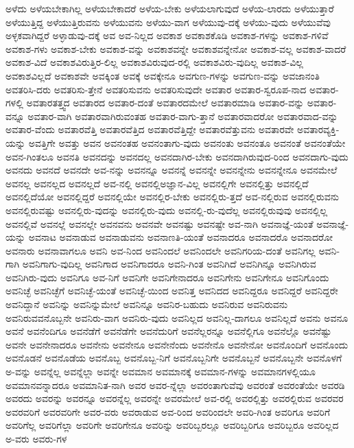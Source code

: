 {ಅಳೆದು
ಅಳೆಯಬೇಕಾಗಿಲ್ಲ
ಅಳೆಯಬೇಕಾದರೆ
ಅಳೆಯ-ಬೇಕು
ಅಳೆಯಲಾಗುವುದೆ
ಅಳೆಯ-ಲಾರದು
ಅಳೆಯುತ್ತಾರೆ
ಅಳೆಯುತ್ತಿದ್ದ
ಅಳೆಯುತ್ತಿರುವನು
ಅಳೆಯುವನು
ಅಳೆಯು-ವಾಗ
ಅಳೆಯುವು-ದಕ್ಕೆ
ಅಳೆಯು-ವುದು
ಅಳೆಯುವೆವು
ಅಳ್ಳಕವಾಗಿದ್ದರೆ
ಅಳ್ಳಾಡುವು-ದಕ್ಕೆ
ಅವ
ಅವ-ನಿಲ್ಲದ
ಅವಕಾಶ
ಅವಕಾಶಕೊಡಿ
ಅವಕಾಶ-ಗಳನ್ನು
ಅವಕಾಶ-ಗಳಿವೆ
ಅವಕಾಶ-ಗಳು
ಅವಕಾಶ-ಬೇಕು
ಅವಕಾಶ-ವನ್ನು
ಅವಕಾಶವನ್ನೇ
ಅವಕಾಶವನ್ನೇನೋ
ಅವಕಾಶ-ವಲ್ಲ
ಅವಕಾಶ-ವಾದರೆ
ಅವಕಾಶ-ವಿದೆ
ಅವಕಾಶವಿರುತ್ತಿರ-ಲಿಲ್ಲ
ಅವಕಾಶವಿರುವುದ-ರಲ್ಲಿ
ಅವಕಾಶವಿರು-ವುದಿಲ್ಲ
ಅವಕಾಶ-ವಿಲ್ಲ
ಅವಕಾಶವಿಲ್ಲದೆ
ಅವಕಾಶವೇ
ಅವಕ್ಕಿಂತ
ಅವಕ್ಕೆ
ಅವಕ್ಕೇನೂ
ಅವಗುಣ-ಗಳನ್ನು
ಅವಗುಣ-ವನ್ನು
ಅವಜಾನಂತಿ
ಅವತರಿಸಿ-ದರು
ಅವತರಿಸು-ತ್ತೇನೆ
ಅವತರಿಸುವನು
ಅವತರಿಸುವುದೇ
ಅವತಾರ
ಅವತಾರ-ಸ್ವರೂಪ-ನಾದ
ಅವತಾರ-ಗಳಲ್ಲಿ
ಅವತಾರತತ್ತ್ವದ
ಅವತಾರದ
ಅವತಾರ-ದಂತೆ
ಅವತಾರದಮೇಲೆ
ಅವತಾರಮಾಡಿ
ಅವತಾರ-ವನ್ನು
ಅವತಾರ-ವನ್ನೂ
ಅವತಾರ-ವಾಗಿ
ಅವತಾರವಾಗಿರುವಂತಹ
ಅವತಾರ-ವಾಗು-ತ್ತಾನೆ
ಅವತಾರವಾದರೋ
ಅವತಾರವಾದ-ವನ್ನು
ಅವತಾರ-ವೆಂದು
ಅವತಾರವೆತ್ತಿ
ಅವತಾರವೆತ್ತಿದ
ಅವತಾರವೆತ್ತಿದ್ದೇ
ಅವತಾರವೆತ್ತುವನು
ಅವತಾರವೇ
ಅವತಾರವ್ಯಕ್ತಿ-ಯನ್ನು
ಅವತ್ತಿಗೇ
ಅವತ್ತು
ಅವನ
ಅವನಂತಹ
ಅವನಂತಾಗು-ವುದು
ಅವನಂತು
ಅವನಂತೂ
ಅವನಂತೆ
ಅವನಂತೆಯೇ
ಅವನ-ಗಿಂತಲೂ
ಅವನತಿ
ಅವನದನ್ನು
ಅವನದಲ್ಲ
ಅವನದಾಗಿರ-ಬೇಕು
ಅವನದಾಗಿರುವುದ-ರಿಂದ
ಅವನದಾಗು-ವುದು
ಅವನದು
ಅವನದೆ
ಅವನದೇ
ಅವ-ನನ್ನು
ಅವನನ್ನೂ
ಅವನನ್ನೆ
ಅವನನ್ನೇ
ಅವನನ್ನೇನು
ಅವನನ್ನೇನೂ
ಅವನಮೇಲೆ
ಅವನಲ್ಲ
ಅವನಲ್ಲದ
ಅವನಲ್ಲದೆ
ಅವ-ನಲ್ಲಿ
ಅವನಲ್ಲಿಅಜ್ಞಾನ-ವಿಲ್ಲ
ಅವನಲ್ಲಿಗೇ
ಅವನಲ್ಲಿತ್ತು
ಅವನಲ್ಲಿದೆ
ಅವನಲ್ಲಿದೆಯೋ
ಅವನಲ್ಲಿದ್ದರೆ
ಅವನಲ್ಲಿಯೇ
ಅವನಲ್ಲಿರ-ಬೇಕು
ಅವನಲ್ಲಿರು-ತ್ತದೆ
ಅವ-ನಲ್ಲಿರುವ
ಅವನಲ್ಲಿರುವನು
ಅವನಲ್ಲಿರುವಷ್ಟು
ಅವನಲ್ಲಿರು-ವುದನ್ನು
ಅವನಲ್ಲಿರು-ವುದು
ಅವನಲ್ಲಿ-ರು-ವುದೆಲ್ಲ
ಅವನಲ್ಲಿರುವುವು
ಅವನಲ್ಲಿಲ್ಲ
ಅವನಲ್ಲಿವೆ
ಅವನಲ್ಲೆ
ಅವನಲ್ಲೇ
ಅವನವನು
ಅವನವೇ
ಅವನಷ್ಟು
ಅವನಷ್ಟೇ
ಅವ-ನಾಗಿ
ಅವನಾಜ್ಞೆ-ಯಂತೆ
ಅವನಾಜ್ಞೆ-ಯನ್ನು
ಅವನಾಟ
ಅವನಾಡುವ
ಅವನಾಡುವನು
ಅವನಾಣತಿ-ಯಂತೆ
ಅವನಾದರೂ
ಅವನಾದರೊ
ಅವನಾದರೋ
ಅವನಾರು
ಅವನಾವಾಗಲೂ
ಅವನಿ
ಅವ-ನಿಂದ
ಅವನಿಂದಲೆ
ಅವನಿಂದಲೇ
ಅವನಿಗರಿಯ-ದಂತೆ
ಅವನಿಗಲ್ಲ
ಅವನಿ-ಗಾಗಿ
ಅವನಿಗಾಗು-ವುದಿಲ್ಲ
ಅವನಿಗಾದ
ಅವನಿಗಾದರೂ
ಅವನಿ-ಗಿಂತ
ಅವನಿಗಿದೆ
ಅವನಿಗಿನ್ನೂ
ಅವನಿಗಿರುವ
ಅವನಿಗಿರು-ವುದು
ಅವನಿಗೂ
ಅವ-ನಿಗೆ
ಅವನಿಗೇ
ಅವನಿಗೇನಾದರೂ
ಅವನಿಗೇನು
ಅವನಿಗೇನೂ
ಅವನಿಗೊಂದು
ಅವನಿಚ್ಛೆ
ಅವನಿಚ್ಛೆಗೆ
ಅವನಿಚ್ಛೆ-ಯಂತೆ
ಅವನಿಚ್ಛೆ-ಯಿಂದ
ಅವನಿತ್ತ
ಅವನಿದದ
ಅವನಿದ್ದರೂ
ಅವನಿದ್ದರೆ
ಅವನಿದ್ದರೇ
ಅವನಿದ್ದಾನೆ
ಅವನಿನ್ನು
ಅವನಿನ್ನುಮೇಲೆ
ಅವನಿನ್ನೂ
ಅವನಿರ-ಬಹುದು
ಅವನಿರುವ
ಅವನಿರುವನು
ಅವನಿರುವವನೊಬ್ಬನೇ
ಅವನಿರು-ವಾಗ
ಅವನಿರು-ವುದು
ಅವನಿಲ್ಲದ
ಅವನಿಲ್ಲ-ದಾಗಲೂ
ಅವನಿಲ್ಲದೆ
ಅವನು
ಅವನೂ
ಅವನೆ
ಅವನೆಂದಿಗೂ
ಅವನೆಡೆಗೆ
ಅವನೆಡೆಗೇ
ಅವನೆದುರಿಗೆ
ಅವನೆಲ್ಲರನ್ನೂ
ಅವನೆಲ್ಲಿಗೂ
ಅವನೆಲ್ಲೊ
ಅವನೆಷ್ಟು
ಅವನೇ
ಅವನೇನಾದರೂ
ಅವನೇನು
ಅವನೇನೂ
ಅವನೇನೆಂದು
ಅವನೇನೊ
ಅವನೇನೋ
ಅವನೊಂದಿಗೆ
ಅವನೊಂದು
ಅವನೊಡನೆ
ಅವನೊಡೆಯ
ಅವನೊಬ್ಬ
ಅವನೊಬ್ಬ-ನಿಗೆ
ಅವನೊಬ್ಬನಿಗೇ
ಅವನೊಬ್ಬನೆ
ಅವನೊಬ್ಬನೇ
ಅವನೊಳಗೆ
ಅ-ವನ್ನು
ಅವನ್ನೆಲ್ಲ
ಅವನ್ನೆಲ್ಲಾ
ಅವನ್ನೇ
ಅವಮಾನ
ಅವಮಾನಕ್ಕೆ
ಅವಮಾನ-ಗಳನ್ನು
ಅವಮಾನಗಳಲ್ಲಿಯೂ
ಅವಮಾನವನ್ನಾದರೂ
ಅವಮಾನಿತ-ನಾಗಿ
ಅವರ
ಅವರ-ನ್ನೆಲ್ಲಾ
ಅವರಂತಾಗುವೆವು
ಅವರಂತೆ
ಅವರಂತೆಯೇ
ಅವರಡಿ
ಅವರದು
ಅವರನ್ನು
ಅವರನ್ನೂ
ಅವರನ್ನೆಲ್ಲ
ಅವರನ್ನೇ
ಅವರಮೇಲೆ
ಅವ-ರಲ್ಲಿ
ಅವರಲ್ಲಿತ್ತು
ಅವರಲ್ಲಿರುವ
ಅವರವರ
ಅವರವರಿಗೆ
ಅವರವರಿಗೇ
ಅವರ-ವರು
ಅವರಾಡುವ
ಅವ-ರಿಂದ
ಅವರಿಂದಲೇ
ಅವರಿ-ಗಿಂತ
ಅವರಿಗೂ
ಅವರಿಗೆ
ಅವರಿಗೆಲ್ಲ
ಅವರಿಗೆಲ್ಲಾ
ಅವರಿಗೇ
ಅವರಿಗೇನೂ
ಅವರಿನ್ನು
ಅವರಿಬ್ಬರಲ್ಲೂ
ಅವರಿಬ್ಬರಿಗೂ
ಅವರಿಬ್ಬರೂ
ಅವರಿಲ್ಲದ
ಅ-ವರು
ಅವರು-ಗಳ
}
